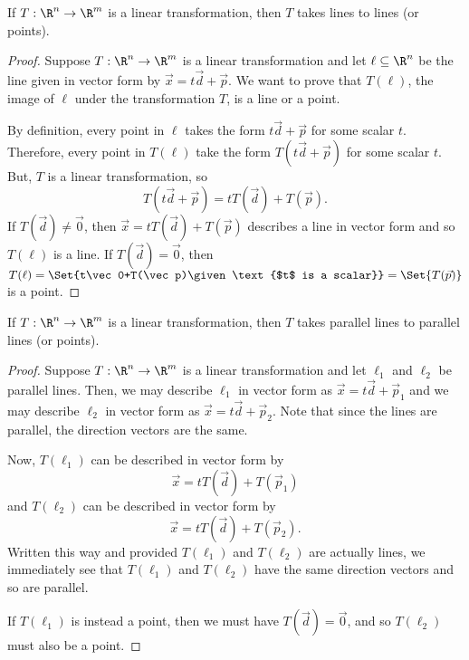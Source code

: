 \begin{theorem}
	If $T:\R^n\to\R^m$ is a linear transformation, then $T$ takes lines to lines (or points).
\end{theorem}
\begin{proof}
	Suppose $T:\R^n\to\R^m$ is a linear transformation and let $\ell\subseteq\R^n$ be the line
	given in vector form by $\vec x=t\vec d+\vec p$. We want to prove that $T(\ell)$, the image of
	$\ell$ under the transformation $T$, is a line or a point.

	By definition, every point in $\ell$ takes the form $t\vec d+\vec p$ for some scalar $t$.
	Therefore, every point in $T(\ell)$ take the form $T(t\vec d+\vec p)$ for some scalar $t$.
	But, $T$ is a linear transformation, so
	\[
		T(t\vec d+\vec p) = tT(\vec d)+T(\vec p).
	\]
	If $T(\vec d)\neq \vec 0$, then $\vec x=tT(\vec d)+T(\vec p)$ describes a line in vector form
	and so $T(\ell)$ is a line.
	If $T(\vec d)=\vec 0$, then $T(\ell) = \Set{t\vec 0+T(\vec p)\given \text{$t$ is a scalar}}=\Set{T(\vec p)}$
	is a point.
\end{proof}

\begin{theorem}
	If $T:\R^n\to\R^m$ is a linear transformation, then $T$ takes parallel lines to parallel lines
	(or points).
\end{theorem}
\begin{proof}
	Suppose $T:\R^n\to\R^m$ is a linear transformation and 
	let $\ell_1$ and $\ell_2$ be parallel lines. Then, we may describe $\ell_1$ in vector form
	as $\vec x=t\vec d+\vec p_1$ and we may describe $\ell_2$ in vector form as $\vec x=t\vec d+\vec p_2$.
	Note that since the lines are parallel, the direction vectors are the same.

	Now, $T(\ell_1)$ can be described in vector form by
	\[
		\vec x=tT(\vec d)+T(\vec p_1)
	\]
	and $T(\ell_2)$ can be described in vector form by
	\[
		\vec x=tT(\vec d)+T(\vec p_2).
	\]
	Written this way and provided $T(\ell_1)$ and
	$T(\ell_2)$ are actually lines, we immediately see that $T(\ell_1)$ and $T(\ell_2)$ have the same direction
	vectors and so are parallel.

	If $T(\ell_1)$ is instead a point, then we must have $T(\vec d)=\vec 0$, and so $T(\ell_2)$ must also be a point.
\end{proof}

